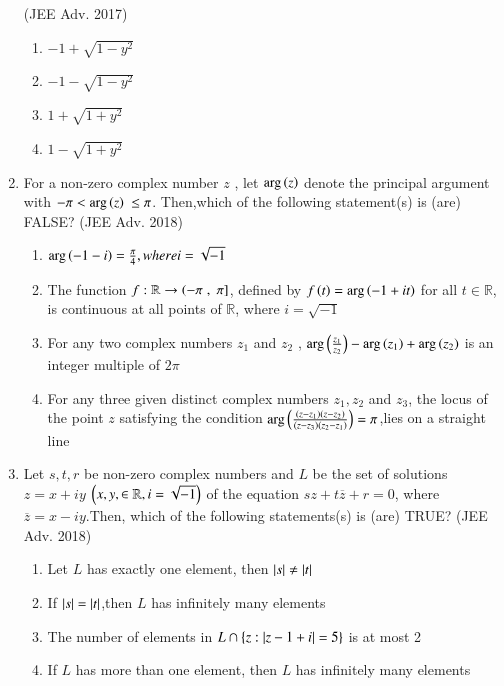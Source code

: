 \documentclass[journal,12pt,twocolumn]{IEEEtran}
\theoremstyle{remark}
\begin{document}
\begin{enumerate}
\hfill (JEE Adv. 2017)
\begin{enumerate}[label=(\alph*)]
    \item $ -1+\sqrt{1-y^2} $
    \item $ -1-\sqrt{1-y^2} $
    \item $ 1+\sqrt{1+y^2} $
    \item $ 1-\sqrt{1+y^2} $
    \end{enumerate}
    \item For a non-zero complex number $ z $ , let $ \mathrm{arg}\left(z\right) $ denote the principal argument with $ -\pi < \mathrm{arg}\left(z\right)\ \leq \pi $. Then,which of the following statement(s) is (are) FALSE?  \hfill (JEE Adv. 2018)
    \begin{enumerate}[label=(\alph*)]
    \item $ \mathrm{arg}\left(-1-i\right)= \frac{\pi}{4},where i= \sqrt{-1} $
    \item The function $ f: \mathbb{R} \to \left(-\pi\right., {}\left.\pi\right] $, defined by $ f\left(t\right)=\mathrm{arg}\left(-1+it\right) $ for all $ t \in \mathbb{R} $, is continuous at all points of $ \mathbb{R} $, where $ i= \sqrt{-1} $
    \item For any two complex numbers $ z_1 $ and $ z_2 $ , $ \mathrm{arg}\left(\frac{z_1}{z_2}\right)-\mathrm{arg}\left(z_1\right)+\mathrm{arg}\left(z_2\right) $ is an integer multiple of $ 2\pi $
    \item For any three given distinct complex numbers $ z_1,z_2 $ and $ z_3 $, the locus of the point $ z $ satisfying the condition $ \mathrm{arg} \left(\frac{\left(z-z_1\right)\left(z-z_2\right)}{\left(z-z_3\right)\left(z_2-z_1\right)}\right) =\pi $,lies on a straight line
    \end{enumerate}
    \item Let $ s, t, r $ be non-zero complex numbers and $ L $ be the set of solutions  $ z = x + iy $ $ \left(x,y, \in \mathbb{R},i=\sqrt{-1}\right) $ of the equation $ sz + t\overline{z} + r = 0 $, where $ \overline{z}=x-iy $.Then, which of the following statements(s) is (are) TRUE? \hfill (JEE Adv. 2018)
    \begin{enumerate}[label=(\alph*)]
    \item Let $ L $ has exactly one element, then $ \left\vert s\right\vert \ne \left\vert t\right\vert $
    \item If $ \left\vert s\right\vert = \left\vert t\right\vert $,then $ L $ has infinitely many elements 
    \item The number of elements in $ L \cap \left\{z:\left\vert z-1+i\right\vert=5\right\} $ is at most 2
    \item If $ L $  has more than one element, then $ L $ has infinitely many elements 
    \end{enumerate}
    \end{enumerate}
\end{document}
